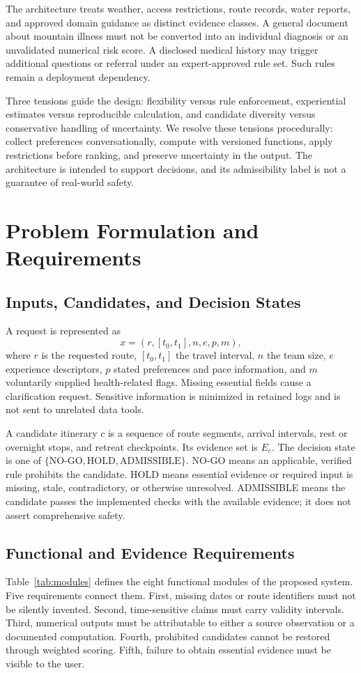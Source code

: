 \documentclass[conference]{IEEEtran}
\begin{document}
The architecture treats weather, access restrictions, route records, water reports, and approved domain guidance as distinct evidence classes. A general document about mountain illness must not be converted into an individual diagnosis or an unvalidated numerical risk score. A disclosed medical history may trigger additional questions or referral under an expert-approved rule set. Such rules remain a deployment dependency.

Three tensions guide the design: flexibility versus rule enforcement, experiential estimates versus reproducible calculation, and candidate diversity versus conservative handling of uncertainty. We resolve these tensions procedurally: collect preferences conversationally, compute with versioned functions, apply restrictions before ranking, and preserve uncertainty in the output. The architecture is intended to support decisions, and its admissibility label is not a guarantee of real-world safety.

\section{Problem Formulation and Requirements}
\subsection{Inputs, Candidates, and Decision States}
A request is represented as
\begin{equation}
 x=(r,[t_0,t_1],n,e,p,m),
\end{equation}
where $r$ is the requested route, $[t_0,t_1]$ the travel interval, $n$ the team size, $e$ experience descriptors, $p$ stated preferences and pace information, and $m$ voluntarily supplied health-related flags. Missing essential fields cause a clarification request. Sensitive information is minimized in retained logs and is not sent to unrelated data tools.

A candidate itinerary $c$ is a sequence of route segments, arrival intervals, rest or overnight stops, and retreat checkpoints. Its evidence set is $E_c$. The decision state is one of $\{\text{NO-GO},\text{HOLD},\text{ADMISSIBLE}\}$. NO-GO means an applicable, verified rule prohibits the candidate. HOLD means essential evidence or required input is missing, stale, contradictory, or otherwise unresolved. ADMISSIBLE means the candidate passes the implemented checks with the available evidence; it does not assert comprehensive safety.

\subsection{Functional and Evidence Requirements}
Table~\ref{tab:modules} defines the eight functional modules of the proposed system. Five requirements connect them. First, missing dates or route identifiers must not be silently invented. Second, time-sensitive claims must carry validity intervals. Third, numerical outputs must be attributable to either a source observation or a documented computation. Fourth, prohibited candidates cannot be restored through weighted scoring. Fifth, failure to obtain essential evidence must be visible to the user.
\end{document}
